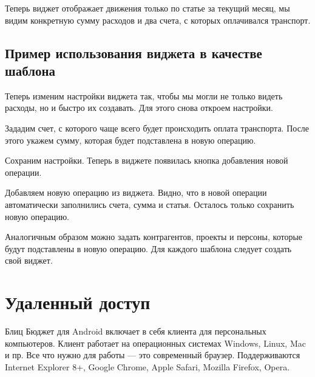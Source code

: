 \documentclass[a4paper,10pt,russian]{sphinxmanual}
\begin{document}
\noindent{}

Теперь виджет отображает движения только по статье  за текущий месяц, мы видим
конкретную сумму расходов и два счета, с которых оплачивался транспорт.


\section{Пример использования виджета в качестве шаблона}
\label{\detokenize{widgets:id6}}
Теперь изменим настройки виджета так, чтобы мы могли не только видеть расходы, но и быстро их создавать. Для
этого снова откроем настройки.

\noindent{}
\noindent{}
\noindent{}

Зададим счет, с которого чаще всего будет происходить оплата транспорта. После этого укажем сумму, которая будет
подставлена в новую операцию.

\noindent{}
\noindent{}
\noindent{}

Сохраним настройки. Теперь в виджете появилась кнопка добавления новой операции.

\noindent{}

Добавляем новую операцию из виджета. Видно, что в новой операции автоматически заполнились счета, сумма и статья. Осталось
только сохранить новую операцию.

Аналогичным образом можно задать контрагентов, проекты и персоны, которые будут подставлены в новую операцию. Для каждого
шаблона следует создать свой виджет.


\chapter{Удаленный доступ}
\label{\detokenize{remote-access:chapter-remote-access}}\label{\detokenize{remote-access:id1}}\label{\detokenize{remote-access::doc}}
Блиц Бюджет для Android включает в себя клиента для персональных компьютеров. Клиент работает на операционных системах
Windows, Linux, Mac и пр. Все что нужно для работы — это современный браузер. Поддерживаются Internet
Explorer 8+, Google Chrome, Apple Safari, Mozilla Firefox, Opera.
\end{document}
